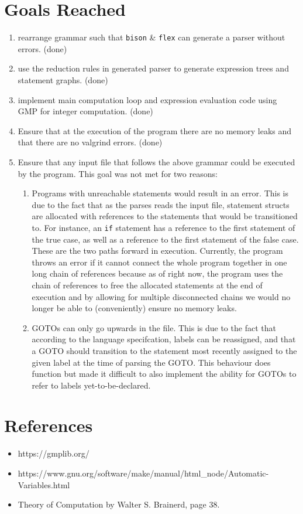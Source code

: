 \documentclass[letterpaper,11pt]{article}
\begin{document}
{	\section{Goals Reached}
	{
		\begin{enumerate}
			\item rearrange grammar such that \texttt{bison} \& \texttt{flex}
			can generate a parser without errors. (done)
			
			\item use the reduction rules in generated parser to generate
			expression trees and statement graphs. (done)
			
			\item implement main computation loop and expression evaluation code
			using GMP for integer computation. (done)
			
			\item Ensure that at the execution of the program there are no
				memory leaks and that there are no valgrind errors. (done)
				
			\item Ensure that any input file that follows the above grammar
			could be executed by the program. This goal was not met for two reasons:
			\begin{enumerate}
				\item Programs with unreachable statements would result in an
				error. This is due to the fact that as the parses reads the input
				file, statement structs are allocated with references
				to the statements that would be transitioned to. For instance,
				an \texttt{if} statement has a reference to the first statement
				of the true case, as well as a reference to the first statement
				of the false case. These are the two paths forward in execution.
				Currently, the program throws an error if it cannot connect the
				whole program together in one long chain of references because
				as of right now, the program uses the chain of references to free
				the allocated statements at the end of execution and by allowing
				for multiple disconnected chains we would no longer be able to
				(conveniently) ensure no memory leaks.
				
				\item GOTOs can only go upwards in the file. This is due to the
				fact that according to the language specifcation, labels can be
				reassigned, and that a GOTO should transition to the statement
				most recently assigned to the given label at the time of parsing
				the GOTO. This behaviour does function but made it difficult to
				also implement the ability for GOTOs to refer to labels
				yet-to-be-declared.
			\end{enumerate}
		\end{enumerate}
	}
	
	\section{References}
	{
		\begin{itemize}
			\item https://gmplib.org/
			\item https://www.gnu.org/software/make/manual/html\_node/Automatic-Variables.html
			\item Theory of Computation by Walter S. Brainerd, page 38.
		\end{itemize}
	}
	
}
\end{document}
